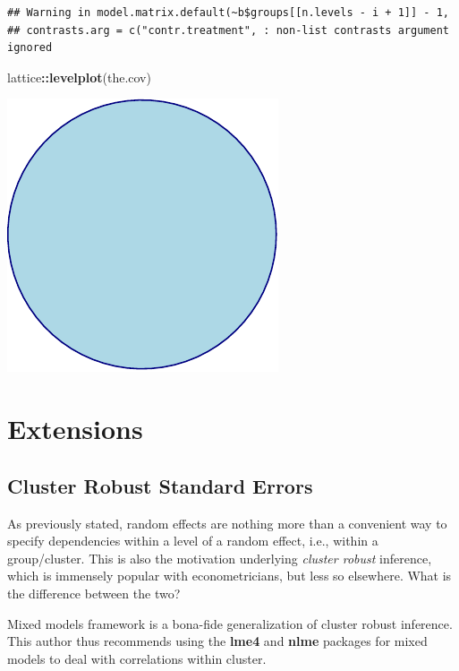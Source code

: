 \documentclass[]{book}
\newenvironment{Shaded}{\begin{snugshade}}{\end{snugshade}}
\newcommand{\KeywordTok}[1]{\textcolor[rgb]{0.13,0.29,0.53}{\textbf{#1}}}
\newcommand{\NormalTok}[1]{#1}
\newcommand{\OperatorTok}[1]{\textcolor[rgb]{0.81,0.36,0.00}{\textbf{#1}}}
\theoremstyle{definition}
\theoremstyle{definition}
\theoremstyle{definition}
\theoremstyle{remark}
\begin{document}
\begin{verbatim}
## Warning in model.matrix.default(~b$groups[[n.levels - i + 1]] - 1,
## contrasts.arg = c("contr.treatment", : non-list contrasts argument ignored
\end{verbatim}

\begin{Shaded}
\begin{Highlighting}[]
\NormalTok{lattice}\OperatorTok{::}\KeywordTok{levelplot}\NormalTok{(the.cov)}
\end{Highlighting}
\end{Shaded}

\includegraphics[width=0.5\linewidth]{Rcourse_files/figure-latex/unnamed-chunk-218-1}

\hypertarget{extensions-1}{%
\section{Extensions}\label{extensions-1}}

\hypertarget{cr-se}{%
\subsection{Cluster Robust Standard Errors}\label{cr-se}}

As previously stated, random effects are nothing more than a convenient way to specify dependencies within a level of a random effect, i.e., within a group/cluster.
This is also the motivation underlying \emph{cluster robust} inference, which is immensely popular with econometricians, but less so elsewhere.
What is the difference between the two?

Mixed models framework is a bona-fide generalization of cluster robust inference.
This author thus recommends using the \textbf{lme4} and \textbf{nlme} packages for mixed models to deal with correlations within cluster.
\end{document}

